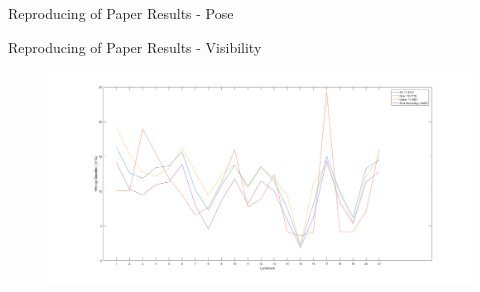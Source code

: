 \documentclass{beamer}
\begin{document}
\begin{frame}{Reproducing of Paper Results - Pose}

\begin{figure}

\end{figure}
\end{frame}

\begin{frame}{Reproducing of Paper Results - Visibility}

\begin{figure}
\centering
\includegraphics[scale=0.25]{fig/mixed_visibility_error_eval}
\end{figure}
\end{frame}
\end{document}
